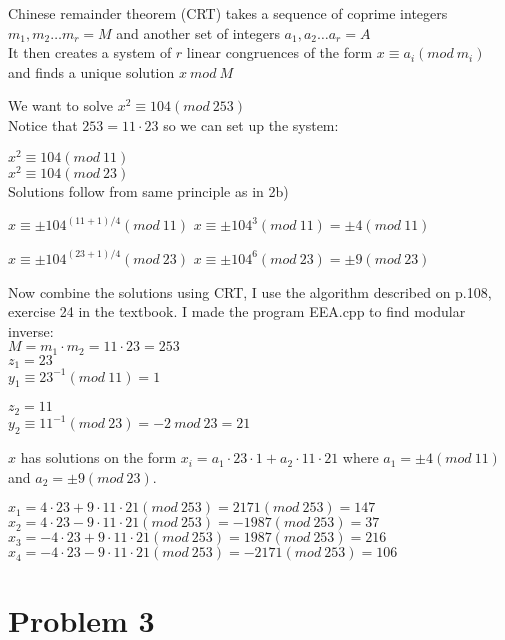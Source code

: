 \documentclass{article}
\begin{document}
Chinese remainder theorem (CRT) takes a sequence of coprime integers $m_{1}, m_{2} \ldots m_{r}=M$ and another set of integers $a_{1}, a_{2} \ldots a_{r}=A$\\
It then creates a system of $r$ linear congruences of the form $x \equiv a_{i} (mod \: m_{i})$ and finds a unique solution $x \: mod \: M$

We want to solve $x^{2} \equiv 104 (mod \: 253)$\\
Notice that $253 = 11 \cdotp 23$ so we can set up the system:

$x^{2} \equiv 104 (mod \: 11)$\\
$x^{2} \equiv 104 (mod \: 23)$\\
Solutions follow from same principle as in 2b)

$x \equiv \pm 104^{(11+1)/4} (mod \: 11)$
$x \equiv \pm 104^{3} (mod \: 11) = \pm 4 (mod \: 11)$

$x \equiv \pm 104^{(23+1)/4} (mod \: 23)$
$x \equiv \pm 104^{6} (mod \: 23) = \pm 9 (mod \: 23)$

Now combine the solutions using CRT, I use the algorithm described on p.108, exercise 24 in the textbook. I made the program EEA.cpp to find modular inverse:\\
$M = m_{1} \cdotp m_{2} = 11 \cdotp 23 = 253$\\
$z_{1} = 23$\\
$y_{1} \equiv  23^{-1} (mod \: 11) = 1$

$z_{2} = 11$\\
$y_{2} \equiv 11^{-1} (mod \: 23) = -2 \: mod \: 23 = 21$

$x$ has solutions on the form $x_{i} = a_{1} \cdotp 23 \cdotp 1 + a_{2} \cdotp 11 \cdotp 21$ where $a_{1} = \pm 4 (mod \: 11)$ and $a_{2} = \pm 9 (mod \: 23)$.

$x_{1} = 4 \cdotp 23 + 9 \cdotp 11 \cdotp 21 (mod \: 253) = 2171 (mod \: 253) = 147$\\
$x_{2} = 4 \cdotp 23 - 9 \cdotp 11 \cdotp 21 (mod \: 253) = -1987 (mod \: 253) = 37$\\
$x_{3} = -4 \cdotp 23 + 9 \cdotp 11 \cdotp 21 (mod \: 253) = 1987 (mod \: 253) = 216$\\
$x_{4} = -4 \cdotp 23 - 9 \cdotp 11 \cdotp 21 (mod \: 253) = -2171 (mod \: 253) = 106$\\

\section*{Problem 3}
\end{document}

